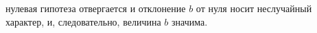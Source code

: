 нулевая гипотеза отвергается и отклонение $ b $ от нуля носит неслучайный характер, и, следовательно, величина $ b $ значима.